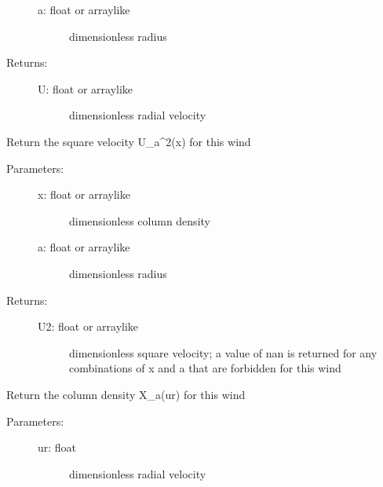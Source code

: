 \documentclass[letterpaper,10pt,english]{sphinxmanual}
\begin{document}
\begin{fulllineitems}
\begin{fulllineitems}
\begin{description}
\begin{description}
\item[{a: float or arraylike}] \leavevmode
dimensionless radius

\end{description}

\item[{Returns:}] \leavevmode\begin{description}
\item[{U: float or arraylike}] \leavevmode
dimensionless radial velocity

\end{description}

\end{description}

\end{fulllineitems}


\begin{fulllineitems}
\label{fulldoc:despotic.winds.pwind.U2}
Return the square velocity U\_a\textasciicircum{}2(x) for this wind
\begin{description}
\item[{Parameters:}] \leavevmode\begin{description}
\item[{x: float or arraylike}] \leavevmode
dimensionless column density

\item[{a: float or arraylike}] \leavevmode
dimensionless radius

\end{description}

\item[{Returns:}] \leavevmode\begin{description}
\item[{U2: float or arraylike}] \leavevmode
dimensionless square velocity; a value of nan is returned
for any combinations of x and a that are forbidden for
this wind

\end{description}

\end{description}

\end{fulllineitems}


\begin{fulllineitems}
\label{fulldoc:despotic.winds.pwind.X}
Return the column density X\_a(ur) for this wind
\begin{description}
\item[{Parameters:}] \leavevmode\begin{description}
\item[{ur: float}] \leavevmode
dimensionless radial velocity


\end{description}
\end{description}
\end{fulllineitems}
\end{fulllineitems}
\end{document}
